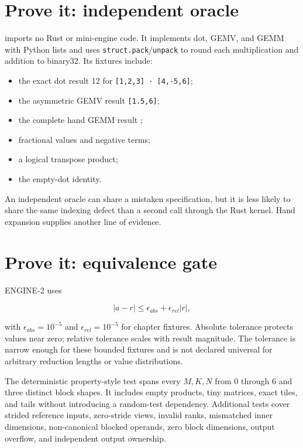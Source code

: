 \section{Prove it: independent
oracle}\label{prove-it-independent-oracle}

\texttt{}
imports no Rust or mini-engine code. It implements dot, GEMV, and GEMM
with Python lists and uses \texttt{struct.pack}/\texttt{unpack} to round
each multiplication and addition to binary32. Its fixtures include:

\begin{itemize}
\tightlist
\item
  the exact dot result 12 for \texttt{{[}1,2,3{]}\ ·\ {[}4,-5,6{]}};
\item
  the asymmetric GEMV result \texttt{{[}1.5,6{]}};
\item
  the complete hand GEMM result \texttt{\seqsplit{[[58,64],[139,154]]}};
\item
  fractional values and negative terms;
\item
  a logical transpose product;
\item
  the empty-dot identity.
\end{itemize}

An independent oracle can share a mistaken specification, but it is less
likely to share the same indexing defect than a second call through the
Rust kernel. Hand expansion supplies another line of evidence.

\section{Prove it: equivalence gate}\label{prove-it-equivalence-gate}

ENGINE-2 uses

\begin{equation}
|a-r|\le \epsilon_{abs}+\epsilon_{rel}|r|,
\end{equation}

with \(\epsilon_{abs}=10^{-5}\) and \(\epsilon_{rel}=10^{-5}\) for
chapter fixtures. Absolute tolerance protects values near zero; relative
tolerance scales with result magnitude. The tolerance is narrow enough
for these bounded fixtures and is not declared universal for arbitrary
reduction lengths or value distributions.

The deterministic property-style test spans every \(M,K,N\) from 0
through 6 and three distinct block shapes. It includes empty products,
tiny matrices, exact tiles, and tails without introducing a random-test
dependency. Additional tests cover strided reference inputs, zero-stride
views, invalid ranks, mismatched inner dimensions, non-canonical blocked
operands, zero block dimensions, output overflow, and independent output
ownership.

